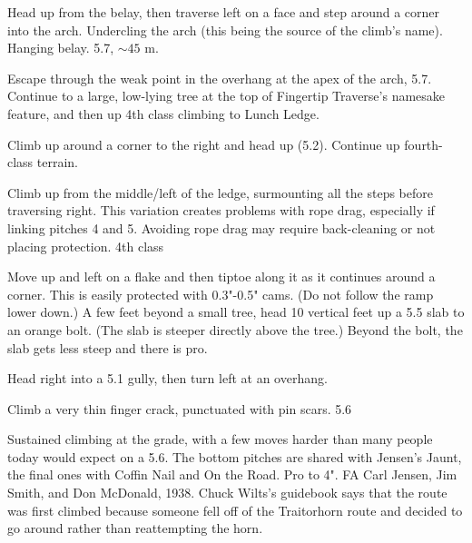 \documentclass{tahquitz}
\begin{document}
 Head up from the belay, then traverse left on a face and
step around a corner into the arch. Undercling the arch (this being
the source of the climb's name). Hanging belay. 5.7, $\sim45$ m.

 Escape through the weak point in the overhang at the apex
of the arch, 5.7. Continue to a large, low-lying tree at the top of Fingertip Traverse's
namesake feature, and then up 4th class climbing to Lunch Ledge.


 Climb up around a corner to the right and head up (5.2).
Continue up fourth-class terrain.

 Climb up from the middle/left of the ledge, surmounting all the steps
before traversing right. This variation creates problems with rope drag, especially
if linking pitches 4 and 5. Avoiding rope drag may require back-cleaning or not
placing protection. 4th class

 Move up and left on a flake and then tiptoe along it as it
continues around a corner.  This is easily protected with 0.3"-0.5"
cams. (Do not follow the ramp lower down.)  A few feet beyond a small
tree, head 10 vertical feet up a 5.5 slab to an orange bolt. (The slab
is steeper directly above the tree.) Beyond the bolt, the slab gets
less steep and there is pro. 

 Head right into a 5.1 gully, then turn left at an overhang.

 Climb a very thin finger crack, punctuated with pin scars. 5.6

\somespace

\upfriction





Sustained climbing at the grade, with a few moves harder than many
people today would expect on a 5.6. The bottom pitches are shared with
Jensen's Jaunt, the final ones with Coffin Nail and On the Road.  Pro
to 4".  FA Carl Jensen, Jim Smith, and Don McDonald, 1938. Chuck
Wilts's guidebook says that the route was first climbed because
someone fell off of the Traitorhorn route and decided to go around
rather than reattempting the horn. 
\end{document}

